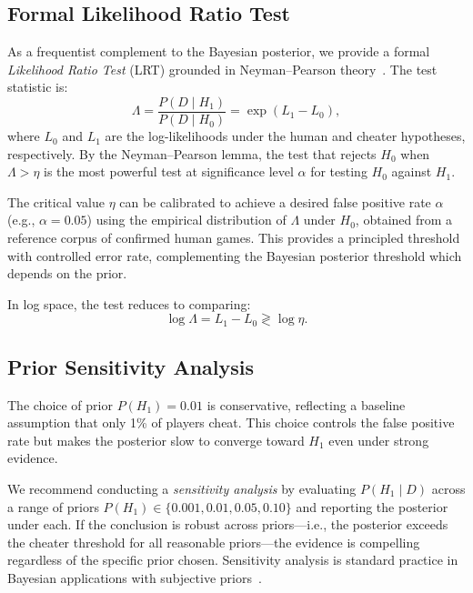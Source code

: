\documentclass[11pt,a4paper]{article}
\begin{document}
\subsection{Formal Likelihood Ratio Test}
\label{sec:lrt}

As a frequentist complement to the Bayesian posterior, we provide a formal
\emph{Likelihood Ratio Test} (LRT) grounded in Neyman--Pearson
theory~\citep{neyman1933most}. The test statistic is:
\begin{equation}
    \Lambda = \frac{P(D \mid H_1)}{P(D \mid H_0)}
    = \exp(L_1 - L_0),
    \label{eq:lrt}
\end{equation}
where $L_0$ and $L_1$ are the log-likelihoods under the human and cheater
hypotheses, respectively. By the Neyman--Pearson lemma, the test that
rejects $H_0$ when $\Lambda > \eta$ is the most powerful test at
significance level $\alpha$ for testing $H_0$ against $H_1$.

The critical value $\eta$ can be calibrated to achieve a desired false
positive rate $\alpha$ (e.g., $\alpha = 0.05$) using the empirical
distribution of $\Lambda$ under $H_0$, obtained from a reference corpus of
confirmed human games. This provides a principled threshold with controlled
error rate, complementing the Bayesian posterior threshold which depends on
the prior.

In log space, the test reduces to comparing:
\begin{equation}
    \log \Lambda = L_1 - L_0 \gtrless \log \eta.
    \label{eq:lrt_log}
\end{equation}

\subsection{Prior Sensitivity Analysis}
\label{sec:sensitivity}

The choice of prior $P(H_1) = 0.01$ is conservative, reflecting a baseline
assumption that only 1\% of players cheat. This choice controls the false
positive rate but makes the posterior slow to converge toward $H_1$ even
under strong evidence.

We recommend conducting a \emph{sensitivity analysis} by evaluating
$P(H_1 \mid D)$ across a range of priors
$P(H_1) \in \{0.001, 0.01, 0.05, 0.10\}$ and reporting the posterior under
each. If the conclusion is robust across priors---i.e., the posterior
exceeds the cheater threshold for all reasonable priors---the evidence is
compelling regardless of the specific prior chosen. Sensitivity analysis
is standard practice in Bayesian applications with subjective
priors~\citep{berger1987testing}.
\end{document}
